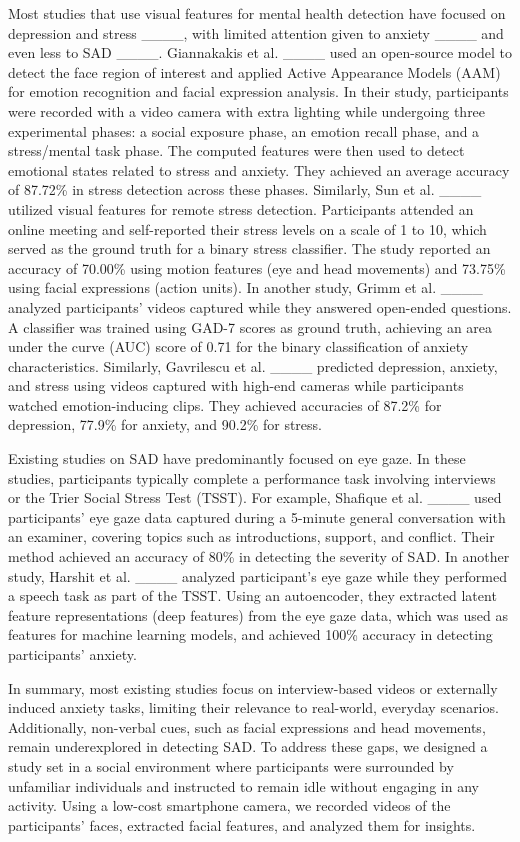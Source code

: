 Most studies that use visual features for mental health detection have focused on depression and stress ____, with limited attention given to anxiety ____ and even less to SAD ____. Giannakakis et al. ____ used an open-source model to detect the face region of interest and applied Active Appearance Models (AAM) for emotion recognition and facial expression analysis. In their study, participants were recorded with a video camera with extra lighting while undergoing three experimental phases: a social exposure phase, an emotion recall phase, and a stress/mental task phase. The computed features were then used to detect emotional states related to stress and anxiety. They achieved an average accuracy of 87.72\% in stress detection across these phases. Similarly, Sun et al. ____ utilized visual features for remote stress detection. Participants attended an online meeting and self-reported their stress levels on a scale of 1 to 10, which served as the ground truth for a binary stress classifier. The study reported an accuracy of 70.00\% using motion features (eye and head movements) and 73.75\% using facial expressions (action units). In another study, Grimm et al. ____ analyzed participants’ videos captured while they answered open-ended questions. A classifier was trained using GAD-7 scores as ground truth, achieving an area under the curve (AUC) score of 0.71 for the binary classification of anxiety characteristics. Similarly, Gavrilescu et al. ____ predicted depression, anxiety, and stress using videos captured with high-end cameras while participants watched emotion-inducing clips. They achieved accuracies of 87.2\% for depression, 77.9\% for anxiety, and 90.2\% for stress.

Existing studies on SAD have predominantly focused on eye gaze. In these studies, participants typically complete a performance task involving interviews or the Trier Social Stress Test (TSST). For example, Shafique et al. ____ used participants' eye gaze data captured during a 5-minute general conversation with an examiner, covering topics such as introductions, support, and conflict. Their method achieved an accuracy of 80\% in detecting the severity of SAD. In another study, Harshit et al. ____ analyzed participant's eye gaze while they performed a speech task as part of the TSST. Using an autoencoder, they extracted latent feature representations (deep features) from the eye gaze data, which was used as features for machine learning models, and achieved 100\% accuracy in detecting participants' anxiety.

In summary, most existing studies focus on interview-based videos or externally induced anxiety tasks, limiting their relevance to real-world, everyday scenarios. Additionally, non-verbal cues, such as facial expressions and head movements, remain underexplored in detecting SAD. To address these gaps, we designed a study set in a social environment where participants were surrounded by unfamiliar individuals and instructed to remain idle without engaging in any activity. Using a low-cost smartphone camera, we recorded videos of the participants' faces, extracted facial features, and analyzed them for insights.